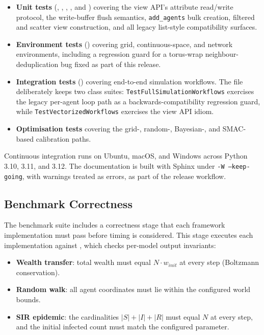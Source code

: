 \documentclass[11pt,a4paper]{article}
\begin{document}
\begin{itemize}
\item \textbf{Unit tests} (, , , , and ) covering the view API's attribute read/write protocol, the write-buffer flush semantics, \texttt{add\_agents} bulk creation, filtered and scatter view construction, and all legacy list-style compatibility surfaces.
\item \textbf{Environment tests} () covering grid, continuous-space, and network environments, including a regression guard for a torus-wrap neighbour-deduplication bug fixed as part of this release.
\item \textbf{Integration tests} () covering end-to-end simulation workflows. The file deliberately keeps two class suites: \texttt{TestFullSimulationWorkflows} exercises the legacy per-agent loop path as a backwards-compatibility regression guard, while \texttt{TestVectorizedWorkflows} exercises the view API idiom.
\item \textbf{Optimisation tests} covering the grid-, random-, Bayesian-, and SMAC-based calibration paths.
\end{itemize}

Continuous integration runs on Ubuntu, macOS, and Windows across Python 3.10, 3.11, and 3.12. The documentation is built with Sphinx under \texttt{-W --keep-going}, with warnings treated as errors, as part of the release workflow.

\subsection{Benchmark Correctness}

The benchmark suite includes a correctness stage that each framework implementation must pass before timing is considered. This stage executes each implementation against , which checks per-model output invariants:

\begin{itemize}
\item \textbf{Wealth transfer}: total wealth must equal $N \cdot w_{init}$ at every step (Boltzmann conservation).
\item \textbf{Random walk}: all agent coordinates must lie within the configured world bounds.
\item \textbf{SIR epidemic}: the cardinalities $|S| + |I| + |R|$ must equal $N$ at every step, and the initial infected count must match the configured parameter.
\end{itemize}
\end{document}
